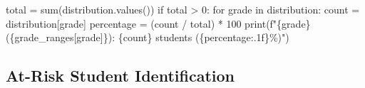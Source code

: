 \documentclass[
  letterpaper,
  DIV=11,
  numbers=noendperiod,
  oneside]{scrreprt}
\newenvironment{Shaded}{}{}
\newcommand{\BuiltInTok}[1]{\textcolor[rgb]{0.84,0.23,0.29}{#1}}
\newcommand{\ControlFlowTok}[1]{\textcolor[rgb]{0.84,0.23,0.29}{#1}}
\newcommand{\DecValTok}[1]{\textcolor[rgb]{0.00,0.36,0.77}{#1}}
\newcommand{\KeywordTok}[1]{\textcolor[rgb]{0.84,0.23,0.29}{#1}}
\newcommand{\NormalTok}[1]{\textcolor[rgb]{0.14,0.16,0.18}{#1}}
\newcommand{\OperatorTok}[1]{\textcolor[rgb]{0.14,0.16,0.18}{#1}}
\newcommand{\SpecialCharTok}[1]{\textcolor[rgb]{0.00,0.36,0.77}{#1}}
\newcommand{\SpecialStringTok}[1]{\textcolor[rgb]{0.01,0.18,0.38}{#1}}
\begin{document}
\begin{Shaded}
\begin{Highlighting}[]
\NormalTok{    total }\OperatorTok{=} \BuiltInTok{sum}\NormalTok{(distribution.values())}
    \ControlFlowTok{if}\NormalTok{ total }\OperatorTok{\textgreater{}} \DecValTok{0}\NormalTok{:}
        \ControlFlowTok{for}\NormalTok{ grade }\KeywordTok{in}\NormalTok{ distribution:}
\NormalTok{            count }\OperatorTok{=}\NormalTok{ distribution[grade]}
\NormalTok{            percentage }\OperatorTok{=}\NormalTok{ (count }\OperatorTok{/}\NormalTok{ total) }\OperatorTok{*} \DecValTok{100}
            \BuiltInTok{print}\NormalTok{(}\SpecialStringTok{f"}\SpecialCharTok{\{}\NormalTok{grade}\SpecialCharTok{\}}\SpecialStringTok{ (}\SpecialCharTok{\{}\NormalTok{grade\_ranges[grade]}\SpecialCharTok{\}}\SpecialStringTok{): }\SpecialCharTok{\{}\NormalTok{count}\SpecialCharTok{\}}\SpecialStringTok{ students (}\SpecialCharTok{\{}\NormalTok{percentage}\SpecialCharTok{:.1f\}}\SpecialStringTok{\%)"}\NormalTok{)}
\end{Highlighting}
\end{Shaded}

\subsection{At-Risk Student
Identification}\label{at-risk-student-identification}
\end{document}
